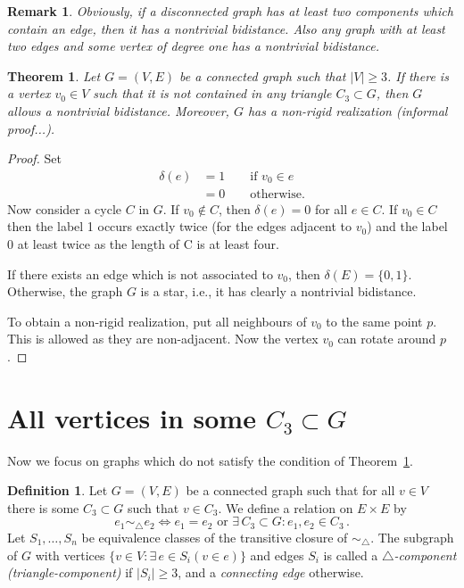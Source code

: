 \documentclass[a4paper, 11pt]{article}
\newcommand{\trcomp}{$\triangle$-component}
\newtheorem{thm}{Theorem}[section]
\newtheorem*{rem}{Remark}
\theoremstyle{definition}
\newtheorem{defn}{Definition}[section]
\begin{document}
\begin{rem}
Obviously, if a disconnected graph has at least two components which contain an edge, then it has a nontrivial bidistance. Also any graph with at least two edges and some vertex of degree one has a nontrivial bidistance.
\end{rem}

\begin{thm}
\label{thm:vertexNotInTriangle}
Let $G=(V,E)$ be a connected graph such that $|V|\geq 3$. If there is a vertex $v_0 \in V$ such that it is not contained in any triangle $C_3\subset G$, then $G$ allows a nontrivial bidistance. Moreover, $G$ has a non-rigid realization (informal proof...).
\end{thm}
\begin{proof}
Set
\begin{align*}
\delta(e)&=1 \qquad \text{if } v_0 \in e \\
		&=0 \qquad \text{otherwise.}
\end{align*} 
Now consider a cycle $C$ in $G$. If $v_0\notin C$, then $\delta(e)=0$ for all $e\in C$. If $v_0\in C$ then the label 1 occurs exactly twice (for the edges adjacent to $v_0$) and the label 0 at least twice as the length of C is at least four.

If there exists an edge which is not associated to $v_0$, then $\delta(E)=\{0,1\}$. Otherwise, the graph $G$ is a star, i.e., it has clearly a nontrivial bidistance.

To obtain a non-rigid realization, put all neighbours of $v_0$ to the same point $p$. This is allowed as they are non-adjacent. Now the vertex $v_0$ can rotate around $p$.
\end{proof}

\section{All vertices in some $C_3\subset G$}
Now we focus on graphs which do not satisfy the condition of Theorem~\ref{thm:vertexNotInTriangle}.
 

\begin{defn}
Let $G=(V,E)$ be a connected graph such that for all $v\in V$ there is some $C_3\subset G$ such that $v\in C_3$. We define a relation on $E\times E$ by 
$$e_1 \sim_{\!\!\bigtriangleup} e_2 \iff e_1=e_2 \text{ or } \exists\, C_3\subset G: e_1, e_2\in C_3\,.$$
Let $S_1, \dots, S_n$ be equivalence classes of the transitive closure of $\sim_{\!\!\bigtriangleup}$. The subgraph of $G$ with vertices $\{v\in V \colon \exists\, e\in S_i (v\in e)\}$ and edges $S_i$ is called a \emph{\trcomp{} (triangle-component)} if $|S_i|\geq 3$, and a \emph{connecting edge} otherwise.
\end{defn}
\end{document}
